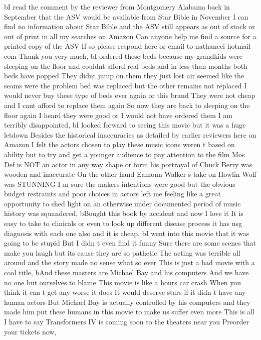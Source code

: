 \documentclass[
]{article}
\newenvironment{Shaded}{}{}
\newcommand{\NormalTok}[1]{#1}
\newcommand{\StringTok}[1]{\textcolor[rgb]{0.25,0.44,0.63}{#1}}
\begin{document}
\begin{Shaded}
\begin{Highlighting}[]
\NormalTok{       b}\StringTok{\textquotesingle{}I read the comment by the reviewer from Montgomery Alabama back in September that the ASV would be available from Star Bible in November I can find no information about Star Bible and the ASV still appears as out of stock or out of print in all my searches on Amazon Can anyone help me find a source for a printed copy of the ASV If so please respond here or email to nathancci hotmail com Thank you very much\textquotesingle{}}\NormalTok{,}
\NormalTok{       b}\StringTok{\textquotesingle{}I ordered these beds because my grandkids were sleeping on the floor and couldnt afford real beds and in less than months both beds have popped They didnt jump on them they just lost air seemed like the seams were the problem bed was replaced but the other remains not replaced I would never buy these type of beds ever again or this brand They were not cheap and I cant afford to replace them again So now they are back to sleeping on the floor again I heard they were good or I would not have ordered them I am terribly disappointed\textquotesingle{}}\NormalTok{,}
\NormalTok{       b}\StringTok{\textquotesingle{}I looked forward to seeing this movie but it was a huge letdown Besides the historical inaccuracies as detailed by earlier reviewers here on Amazon I felt the actors chosen to play these music icons weren t based on ability but to try and get a younger audience to pay attention to the film Mos Def is NOT an actor in any way shape or form his portrayal of Chuck Berry was wooden and inaccurate On the other hand Eamonn Walker s take on Howlin Wolf was STUNNING I m sure the makers intentions were good but the obvious budget restraints and poor choices in actors left me feeling like a great opportunity to shed light on an otherwise under documented period of music history was squandered\textquotesingle{}}\NormalTok{,}
\NormalTok{       b}\StringTok{\textquotesingle{}Bought this book by accident and now I love it It is easy to take to clinicals or even to look up different disease process it has nsg diagnosis with each one also and it is cheap\textquotesingle{}}\NormalTok{,}
\NormalTok{       b}\StringTok{\textquotesingle{}I went into this movie that it was going to be stupid But I didn t even find it funny Sure there are some scenes that make you laugh but its cause they are so pathetic The acting was terrible all around and the story made no sense what so ever This is just a bad movie with a cool title\textquotesingle{}}\NormalTok{,}
\NormalTok{       b}\StringTok{\textquotesingle{}And these masters are Michael Bay and his computers And we have no one but ourselves to blame This movie is like a hours car crash When you think it can t get any worse it does It would deserve stars if it didn t have any human actors But Michael Bay is actually controlled by his computers and they made him put these humans in this movie to make us suffer even more This is all I have to say Transformers IV is coming soon to the theaters near you Preorder your tickets now\textquotesingle{}}\NormalTok{,}

\end{Highlighting}
\end{Shaded}
\end{document}
